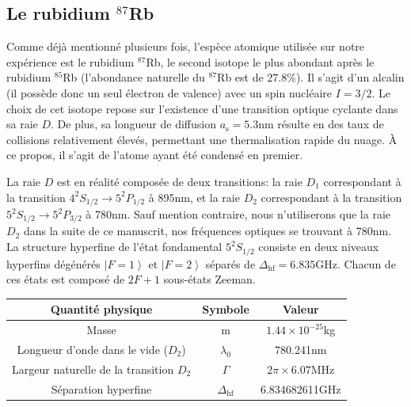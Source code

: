\subsection{Le rubidium ${}^{87}$Rb}
Comme déjà mentionné plusieurs fois, l'espèce atomique utilisée sur notre expérience est le rubidium ${}^{87}$Rb, le second isotope le plus abondant après le rubidium ${}^{85}$Rb (l'abondance naturelle du ${}^{87}$Rb est de 27.8\%). Il s'agit d'un alcalin (il possède donc un seul électron de valence) avec un spin nucléaire $I=3/2$. Le choix de cet isotope repose sur l'existence d'une transition optique cyclante dans sa raie $D$. De plus, sa longueur de diffusion $a_{\mathrm{s}}=5.3$nm résulte en des taux de collisions relativement élevés, permettant une thermalisation rapide du nuage. À ce propos, il s'agit de l'atome ayant été condensé en premier. \citep{anderson1995observation}

La raie $D$ est en réalité composée de deux transitions: la raie $D_1$ correspondant à la transition $4^2S_{1/2}\rightarrow5^2P_{1/2}$ à 895nm, et la raie $D_2$ correspondant à la transition $5^2S_{1/2}\rightarrow5^2P_{3/2}$ à 780nm. Sauf mention contraire, nous n'utiliserons que la raie $D_2$ dans la suite de ce manuscrit, nos fréquences optiques se trouvant à 780nm. La structure hyperfine de l'état fondamental $5^2S_{1/2}$ consiste en deux niveaux hyperfins dégénérés $\left| F=1 \right\rangle$ et $\left| F=2 \right\rangle$ séparés de $\Delta_{\mathrm{hf}}=6.835$GHz. Chacun de ces états est composé de $2F+1$ sous-états Zeeman. 

\begin{center}
\begin{tabular}{ |c|c|c| }
\hline
\textbf{Quantité physique} & \textbf{Symbole} & \textbf{Valeur} \\
\hline
Masse & m & $1.44 \times 10^{-25}$kg \\
\hline
Longueur d'onde dans le vide ($D_2$) & $\lambda_{\mathrm{0}}$ & 780.241nm \\
\hline
Largeur naturelle de la transition $D_2$ & $\Gamma$ & $2\pi \times 6.07$MHz \\
\hline
Séparation hyperfine & $\Delta_{\mathrm{hf}}$ & 6.834682611GHz \\
\hline
\end{tabular}
\end{center}


